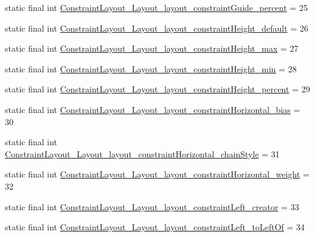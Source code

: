 \begin{DoxyCompactItemize}
\item 
static final int \mbox{\hyperlink{classandroid_1_1support_1_1constraint_1_1_r_1_1styleable_a6cab8737437703bf14820698c4d0c6c1}{Constraint\+Layout\+\_\+\+Layout\+\_\+layout\+\_\+constraint\+Guide\+\_\+percent}} = 25
\item 
static final int \mbox{\hyperlink{classandroid_1_1support_1_1constraint_1_1_r_1_1styleable_af7540577551972ec2374d31348e3eb58}{Constraint\+Layout\+\_\+\+Layout\+\_\+layout\+\_\+constraint\+Height\+\_\+default}} = 26
\item 
static final int \mbox{\hyperlink{classandroid_1_1support_1_1constraint_1_1_r_1_1styleable_afe4b364679de809df9c8f86c28144c1e}{Constraint\+Layout\+\_\+\+Layout\+\_\+layout\+\_\+constraint\+Height\+\_\+max}} = 27
\item 
static final int \mbox{\hyperlink{classandroid_1_1support_1_1constraint_1_1_r_1_1styleable_a1d2cff20e0e8ff949709eb78bae8830b}{Constraint\+Layout\+\_\+\+Layout\+\_\+layout\+\_\+constraint\+Height\+\_\+min}} = 28
\item 
static final int \mbox{\hyperlink{classandroid_1_1support_1_1constraint_1_1_r_1_1styleable_ac879846f445053fab9f47852fe627fbd}{Constraint\+Layout\+\_\+\+Layout\+\_\+layout\+\_\+constraint\+Height\+\_\+percent}} = 29
\item 
static final int \mbox{\hyperlink{classandroid_1_1support_1_1constraint_1_1_r_1_1styleable_afc12da36cc322e5a58b78035b4142fa6}{Constraint\+Layout\+\_\+\+Layout\+\_\+layout\+\_\+constraint\+Horizontal\+\_\+bias}} = 30
\item 
static final int \mbox{\hyperlink{classandroid_1_1support_1_1constraint_1_1_r_1_1styleable_a132cd8436999ec88e957f0e5e79ef3c0}{Constraint\+Layout\+\_\+\+Layout\+\_\+layout\+\_\+constraint\+Horizontal\+\_\+chain\+Style}} = 31
\item 
static final int \mbox{\hyperlink{classandroid_1_1support_1_1constraint_1_1_r_1_1styleable_a93852127e5a83ad2d9b604d0ed040127}{Constraint\+Layout\+\_\+\+Layout\+\_\+layout\+\_\+constraint\+Horizontal\+\_\+weight}} = 32
\item 
static final int \mbox{\hyperlink{classandroid_1_1support_1_1constraint_1_1_r_1_1styleable_a4d519e7863b64a5611de2be8034406e0}{Constraint\+Layout\+\_\+\+Layout\+\_\+layout\+\_\+constraint\+Left\+\_\+creator}} = 33
\item 
static final int \mbox{\hyperlink{classandroid_1_1support_1_1constraint_1_1_r_1_1styleable_a3ad07328f29f209d6d553b0b3848f683}{Constraint\+Layout\+\_\+\+Layout\+\_\+layout\+\_\+constraint\+Left\+\_\+to\+Left\+Of}} = 34

\end{DoxyCompactItemize}
